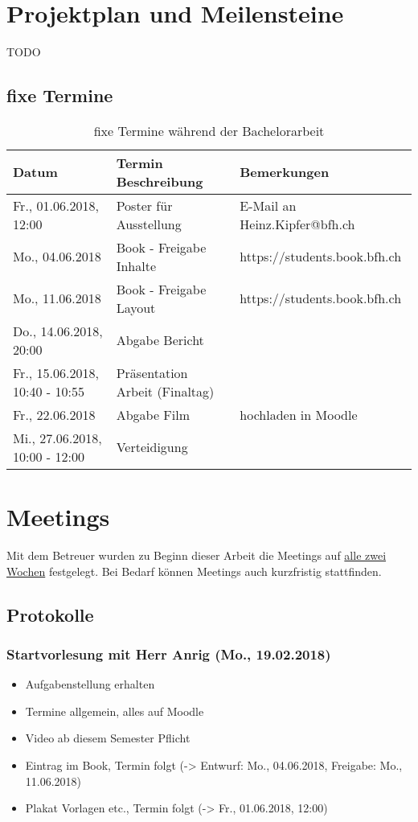 \section{Projektplan und Meilensteine}
TODO

\subsection{fixe Termine}
\begin{table}[H]
	\centering
	\begin{tabular}{lll} \toprule
		\textbf{Datum} 			& \textbf{Termin Beschreibung}		& \textbf{Bemerkungen}		\\ \midrule
		Fr., 01.06.2018, 12:00		& Poster für Ausstellung 		& E-Mail an Heinz.Kipfer@bfh.ch	\\ \midrule
		Mo., 04.06.2018 		& Book - Freigabe Inhalte		& https://students.book.bfh.ch	\\ \midrule
		Mo., 11.06.2018 		& Book - Freigabe Layout		& https://students.book.bfh.ch	\\ \midrule
		Do., 14.06.2018, 20:00		& Abgabe Bericht			&  				\\ \midrule
		Fr., 15.06.2018, 10:40 - 10:55	& Präsentation Arbeit (Finaltag)	&  				\\ \midrule
		Fr., 22.06.2018			& Abgabe Film				& hochladen in Moodle		\\ \midrule
		Mi., 27.06.2018, 10:00 - 12:00	& Verteidigung				&				\\ \bottomrule
	\end{tabular}
	\caption{fixe Termine während der Bachelorarbeit}
	\label{tab:fixeTermine}
\end{table}


\section{Meetings}
Mit dem Betreuer wurden zu Beginn dieser Arbeit die Meetings auf \underline{alle zwei Wochen} festgelegt. Bei Bedarf können Meetings auch kurzfristig stattfinden.
\subsection{Protokolle}
\subsubsection{Startvorlesung mit Herr Anrig (Mo., 19.02.2018)}
\begin{itemize}
	\item Aufgabenstellung erhalten
	\item Termine allgemein, alles auf Moodle
	\item Video ab diesem Semester Pflicht
	\item Eintrag im Book, Termin folgt (-> Entwurf: Mo., 04.06.2018, Freigabe: Mo., 11.06.2018)
	\item Plakat Vorlagen etc., Termin folgt (-> Fr., 01.06.2018, 12:00)
\end{itemize}

